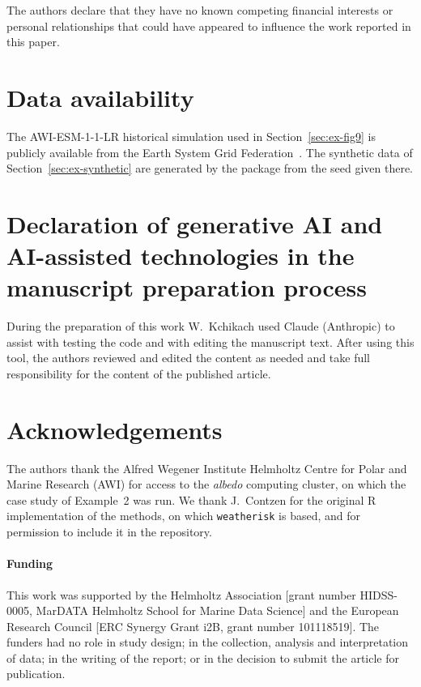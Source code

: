 \documentclass[preprint,12pt,a4paper]{elsarticle}
\begin{document}
The authors declare that they have no known competing financial
interests or personal relationships that could have appeared to
influence the work reported in this paper.

\section*{Data availability}
The AWI-ESM-1-1-LR historical simulation used in
Section~\ref{sec:ex-fig9} is publicly available from the Earth
System Grid Federation~\cite{danek2020}. The synthetic data of
Section~\ref{sec:ex-synthetic} are generated by the package from the
seed given there.

\section*{Declaration of generative AI and AI-assisted technologies in the manuscript preparation process}
During the preparation of this work W.~Kchikach used Claude
(Anthropic) to assist with testing the code and with editing the
manuscript text. After using this
tool, the authors reviewed and edited the content as needed and
take full responsibility for the content of the published article.

\section*{Acknowledgements}
The authors thank the Alfred Wegener Institute Helmholtz Centre for
Polar and Marine Research (AWI) for access to the \emph{albedo}
computing cluster, on which the case study of Example~2 was run. We thank J.~Contzen for the original R implementation of
the methods, on which \texttt{weatherisk} is based, and for permission to include it in the repository.

\paragraph*{Funding}
This work was supported by the Helmholtz Association [grant number
HIDSS-0005, MarDATA Helmholtz School for Marine Data Science] and the
European Research Council [ERC Synergy Grant i2B, grant number
101118519]. The funders had no role in study design; in the
collection, analysis and interpretation of data; in the writing of
the report; or in the decision to submit the article for
publication.
\end{document}
